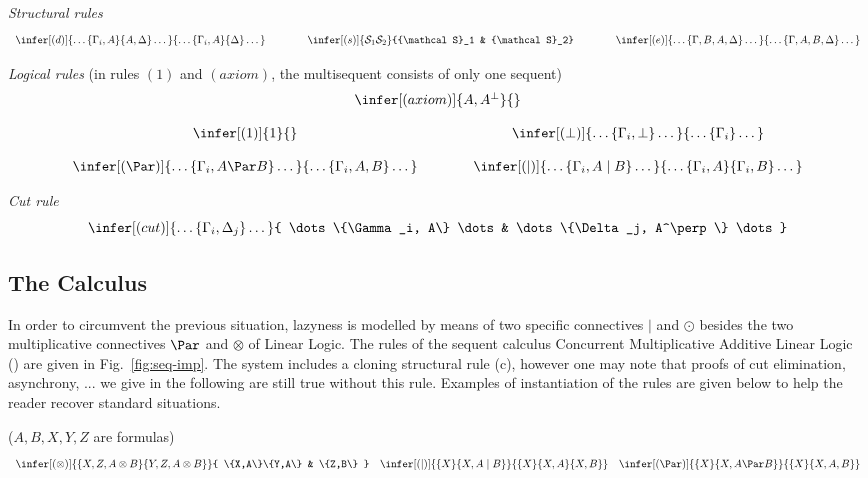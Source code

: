 \documentclass{llncs}
\newcommand{\ctimes}{\odot}
\newcommand{\cpar}{\mid}
\begin{document}
\begin{Fig.}
{\em Structural rules}
\[
\begin{array}{lclcl}
\infer[(d)]{\dots \{\Gamma_i, A\} \{A, \Delta\} \dots}
           {\dots \{\Gamma_i, A\} \{\Delta\} \dots}
&~~~~~~&
\infer[(s)]{{\mathcal S}_1 {\mathcal S}_2}
      {{\mathcal S}_1
      &
      {\mathcal S}_2}
&~~~~~~&
\infer[(e)]{\dots \{\Gamma, B, A, \Delta \} \dots}
      {\dots \{\Gamma, A, B, \Delta \} \dots}
\end{array}
\]

{\em Logical rules} (in rules $(1)$ and $(axiom)$, the multisequent consists of only one sequent)
\[
\begin{array}{ccc}
\multicolumn{3}{c}{\infer[(axiom)]{A, A^\perp}{}}
\\ \\
\infer[(1)]{1}{} 
&~~~~~~&
\infer[(\bot)]{\dots \{\Gamma_i,\bot\} \dots}
      {\dots \{\Gamma_i\} \dots}
\\ \\
\infer[(\Par)]{\dots \{\Gamma_i,A\Par B\} \dots}
              {\dots \{\Gamma_i,A, B\} \dots} 
&~~~~~~&
\infer[(\cpar)]{\dots \{\Gamma_i, A\cpar B\} \dots}
     {\dots \{\Gamma_i, A\} \{\Gamma_i,B\} \dots}
\end{array}
\]

{\em Cut rule}
\[
\infer[(cut)]{\dots \{\Gamma_i, \Delta_j\} \dots}
    {
    \dots \{\Gamma_i, A\} \dots
    &
    \dots \{\Delta_j, A^\perp\} \dots}
\]
\caption{Sequent calculus for a bad lazy MLL. $i,j \in \mathbb{N}^*$ in rules.}\label{badCLL}
\end{Fig.}

\subsection{The Calculus \CMALL}

In order to circumvent the previous situation, lazyness is modelled by means of two specific connectives $\cpar$ and $\ctimes$ besides the two multiplicative connectives $\Par$ and $\otimes$ of Linear Logic. The rules of the sequent calculus Concurrent Multiplicative Additive Linear Logic (\CMALL) are given in Fig.~\ref{fig:seq-imp}. The system includes a cloning structural rule (c), however one may note that proofs of cut elimination, asynchrony, ... we give in the following are still true without this rule. Examples of instantiation of the rules are given below to help the reader recover standard situations.


\begin{example}
($A, B, X, Y, Z$ are formulas)\\
\[
\begin{array}{ccc}
\infer[(\otimes)]{\{X,Z,A\otimes B\}\{Y,Z,A\otimes B\}}{
	\{X,A\}\{Y,A\}
	&
	\{Z,B\}
}
&
\infer[(\cpar)]{\{X\}\{X,A\cpar B\}}{
	\{X\}\{X,A\}\{X,B\}
}
&
\infer[(\Par)]{\{X\}\{X,A\Par B\}}{
	\{X\}\{X,A,B\}
}
\end{array}
\]
\end{example}
\end{document}
